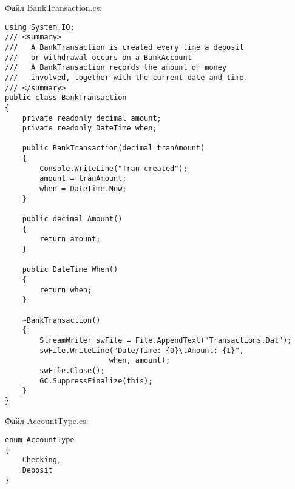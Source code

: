 Файл BankTransaction.cs:
\begingroup
\fontsize{12pt}{12pt}\selectfont
\linespread{1.5}
\begin{verbatim}
using System.IO;
/// <summary>
///   A BankTransaction is created every time a deposit 
///   or withdrawal occurs on a BankAccount
///   A BankTransaction records the amount of money
///   involved, together with the current date and time.
/// </summary>
public class BankTransaction
{
    private readonly decimal amount;
    private readonly DateTime when;

    public BankTransaction(decimal tranAmount)
    {
        Console.WriteLine("Tran created");
        amount = tranAmount;
        when = DateTime.Now;
    }

    public decimal Amount()
    {
        return amount;
    }

    public DateTime When()
    {
        return when;
    }			 

    ~BankTransaction()
    {
        StreamWriter swFile = File.AppendText("Transactions.Dat");
        swFile.WriteLine("Date/Time: {0}\tAmount: {1}", 
                        when, amount);
        swFile.Close();
        GC.SuppressFinalize(this);
    }
}

\end{verbatim}  
\endgroup

Файл AccountType.cs:
\begingroup
\fontsize{12pt}{12pt}\selectfont
\linespread{1.5}
\begin{verbatim}
enum AccountType 
{ 
    Checking, 
    Deposit 
}
\end{verbatim}  
\endgroup
\endinput
